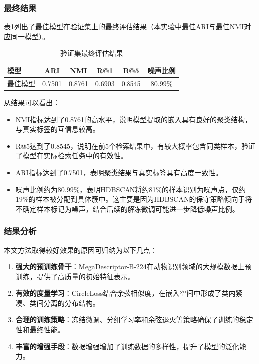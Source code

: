 \documentclass[a4paper]{article}
\begin{document}
\subsubsection{最终结果}

表\ref{tab:results}列出了最佳模型在验证集上的最终评估结果（本实验中最佳ARI与最佳NMI对应同一模型）。

\begin{table}[htbp]
\centering
\caption{验证集最终评估结果}
\label{tab:results}
\begin{tabular}{lccccc}
\toprule
模型 & ARI & NMI & R@1 & R@5 & 噪声比例 \\
\midrule
最佳模型 & 0.7501 & 0.8761 & 0.6903 & 0.8545 & 80.99\% \\
\bottomrule
\end{tabular}
\end{table}

从结果可以看出：

\begin{itemize}
    \item NMI指标达到了0.8761的高水平，说明模型提取的嵌入具有良好的聚类结构，与真实标签的互信息较高。
    \item R@5达到了0.8545，说明在前5个检索结果中，有较大概率包含同类样本，验证了模型在实际检索任务中的有效性。
    \item ARI指标达到了0.7501，表明聚类结果与真实标签具有高度一致性。
    \item 噪声比例约为80.99\%，表明HDBSCAN将约81\%的样本识别为噪声点，仅约19\%的样本被分配到具体簇中。这主要是因为HDBSCAN的保守策略倾向于将不确定样本标记为噪声，结合后续的解冻微调可能进一步降低噪声比例。
\end{itemize}

\subsubsection{结果分析}

本文方法取得较好效果的原因可归纳为以下几点：

\begin{enumerate}
    \item \textbf{强大的预训练骨干}：MegaDescriptor-B-224在动物识别领域的大规模数据上预训练，提供了高质量的初始特征表示。
    \item \textbf{有效的度量学习}：CircleLoss结合余弦相似度，在嵌入空间中形成了类内紧凑、类间分离的分布结构。
    \item \textbf{合理的训练策略}：冻结微调、分组学习率和余弦退火等策略确保了训练的稳定性和最终性能。
    \item \textbf{丰富的增强手段}：数据增强增加了训练数据的多样性，提升了模型的泛化能力。
\end{enumerate}
\end{document}
